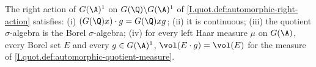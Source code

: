 The right action of $G(\A)^1$ on $G(\Q)\backslash G(\A)^1$ of \cref{I.quot.def:automorphic-right-action} satisfies: (i) $(G(\Q)x)\cdot g=G(\Q)xg$; (ii) it is continuous; (iii) the quotient $\sigma$-algebra is the Borel $\sigma$-algebra; (iv) for every left Haar measure $\mu$ on $G(\A)$, every Borel set $E$ and every $g\in G(\A)^1$, $\vol(E\cdot g)=\vol(E)$ for the measure of \cref{I.quot.def:automorphic-quotient-measure}.
